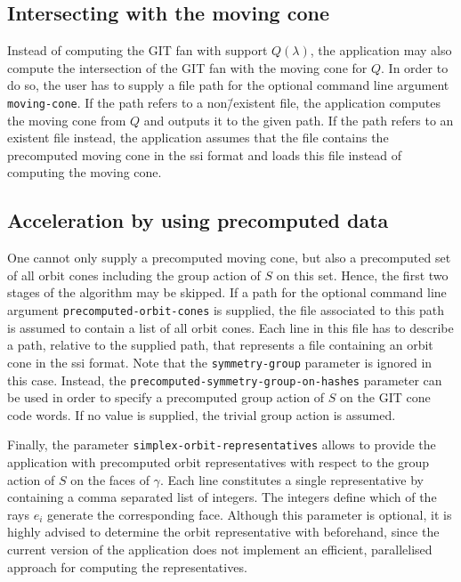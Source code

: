 \subsection*{Intersecting with the moving cone}

Instead of computing the GIT fan with support $Q(\lambda)$, the application may also compute the intersection of the GIT fan with the moving cone for $Q$. In order to do so, the user has to supply a file path for the optional command line argument \texttt{moving-cone}. If the path refers to a non\=/existent file, the application computes the moving cone from $Q$ and outputs it to the given path. If the path refers to an existent file instead, the application assumes that the file contains the precomputed moving cone in the \ac{ssi} format and loads this file instead of computing the moving cone.

\subsection*{Acceleration by using precomputed data}

One cannot only supply a precomputed moving cone, but also a precomputed set of all orbit cones including the group action of $S$ on this set. Hence, the first two stages of the algorithm may be skipped. If a path for the optional command line argument \texttt{precomputed-orbit-cones} is supplied, the file associated to this path is assumed to contain a list of all orbit cones. Each line in this file has to describe a path, relative to the supplied path, that represents a file containing an orbit cone in the \ac{ssi} format. Note that the \texttt{symmetry-group} parameter is ignored in this case. Instead, the \texttt{precomputed-symmetry-group-on-hashes} parameter can be used in order to specify a precomputed group action of $S$ on the GIT cone code words. If no value is supplied, the trivial group action is assumed.

Finally, the parameter \texttt{simplex-orbit-representatives} allows to provide the application with precomputed orbit representatives with respect to the group action of $S$ on the faces of $\gamma$. Each line constitutes a single representative by containing a comma separated list of integers. The integers define which of the rays $e_i$ generate the corresponding face. Although this parameter is optional, it is highly advised to determine the orbit representative with \gap{} \cite{gap} beforehand, since the current version of the application does not implement an efficient, parallelised approach for computing the representatives.

